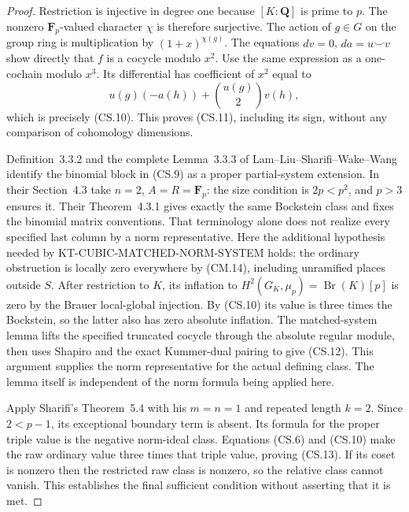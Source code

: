 \begin{proof}
Restriction is injective in degree one because
\([K:\mathbf Q]\) is prime to \(p\).  The nonzero
\(\mathbf F_p\)-valued character \(\chi\) is therefore
surjective.  The action of \(g\in G\) on the group
ring is multiplication by \((1+x)^{\chi(g)}\).
The equations \(dv=0\), \(da=u\smile v\) show
directly that \(f\) is a cocycle modulo \(x^2\).
Use the same expression as a one-cochain modulo \(x^3\).
Its differential has coefficient of \(x^2\) equal to
\[
 u(g)(-a(h))+\binom{u(g)}2v(h),
                                                               \tag{CS.14}
\]
which is precisely (CS.10).  This proves (CS.11),
including its sign, without any comparison of
cohomology dimensions.

Definition~3.3.2 and the complete Lemma~3.3.3 of
Lam--Liu--Sharifi--Wake--Wang identify the binomial
block in (CS.9) as a proper partial-system extension.
In their Section~4.3 take \(n=2\), \(A=R=\mathbf F_p\):
the size condition is \(2p<p^2\), and \(p>3\)
ensures it.  Their Theorem~4.3.1 gives exactly the
same Bockstein class and fixes the binomial matrix
conventions.  That terminology alone does not
realize every specified last column by a norm
representative.  Here the additional hypothesis
needed by KT-CUBIC-MATCHED-NORM-SYSTEM holds:
the ordinary obstruction is locally zero everywhere
by (CM.14), including unramified places outside
\(S\).  After restriction to \(K\), its inflation
to \(H^2(G_K,\mu_p)=\operatorname{Br}(K)[p]\)
is zero by the Brauer local-global injection.
By (CS.10) its value is three times the Bockstein,
so the latter also has zero absolute inflation.
The matched-system lemma lifts the specified
truncated cocycle through the absolute regular
module, then uses Shapiro and the exact Kummer-dual
pairing to give (CS.12).  This argument supplies
the norm representative for the actual defining
class.  The lemma itself is independent of the
norm formula being applied here.

Apply Sharifi's Theorem~5.4 with his \(m=n=1\)
and repeated length \(k=2\).  Since \(2<p-1\),
its exceptional boundary term is absent.  Its
formula for the proper triple value is the
negative norm-ideal class.  Equations (CS.6)
and (CS.10) make the raw ordinary value three
times that triple value, proving (CS.13).
If its coset is nonzero then the restricted raw
class is nonzero, so the relative class cannot
vanish.  This establishes the final sufficient
condition without asserting that it is met.
\end{proof}

